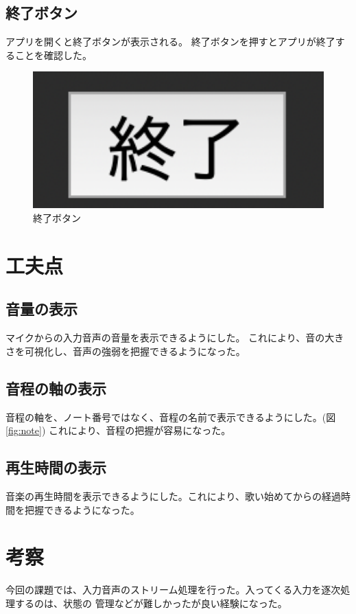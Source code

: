 \documentclass[a4paper,11pt]{jsarticle}
\begin{document}
\subsection{終了ボタン}
アプリを開くと終了ボタンが表示される。
終了ボタンを押すとアプリが終了することを確認した。

\begin{figure}[h]
\centering
\includegraphics[keepaspectratio, width=13cm]
{./images/work3_quit.png}
\caption{終了ボタン}
\label{fig:quit}
\end{figure}

\section{工夫点}
\subsection{音量の表示}
マイクからの入力音声の音量を表示できるようにした。
これにより、音の大きさを可視化し、音声の強弱を把握できるようになった。

\subsection{音程の軸の表示}
音程の軸を、ノート番号ではなく、音程の名前で表示できるようにした。(図\ref{fig:note})
これにより、音程の把握が容易になった。

\subsection{再生時間の表示}
音楽の再生時間を表示できるようにした。これにより、歌い始めてからの経過時間を把握できるようになった。

\section{考察}
今回の課題では、入力音声のストリーム処理を行った。入ってくる入力を逐次処理するのは、状態の
管理などが難しかったが良い経験になった。

\end{document}

